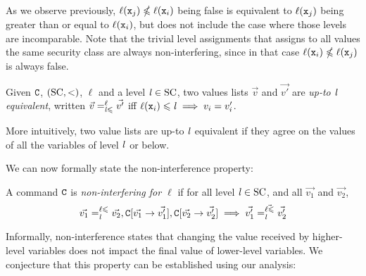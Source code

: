 As we observe previously, \(\ell(\mathtt{x}_j) \nleqslant \ell(\mathtt{x}_i)\) being false is equivalent to \(\ell(\mathtt{x}_j)\) being greater than or equal to \(\ell(\mathtt{x}_i)\), but does not include the case where those levels are incomparable.
Note that the trivial level assignments that assigns to all values the same security class are always non-interfering, since in that case \(\ell(\mathtt{x}_i) \nleqslant \ell(\mathtt{x}_j)\) is always false.


\begin{definition}[Up-to %
equivalence%
]
Given \(\mathtt{C}\), \((\mathrm{SC}, <)\), \(\ell\) and a level \(\mathit{l} \in \mathrm{SC}\), two values lists \(\vec{v}\) and \(\vec{v'}\) are \emph{up-to \(\mathit{l}\) equivalent}, written \(\vec{v}=^{\ell}_{\mathit{l} \leqslant} \vec{v'}\) iff
\(
\ell(\comm{x}_i) \leqslant \scl{l} \implies v_i=v'_i%
\).
\end{definition}

More intuitively, two value lists are up-to %
\(\mathit{l}\) equivalent if they agree on the values of all the variables of level \(\mathit{l}\) or below. %

We can now formally state the non-interference property:

\begin{definition}
\label{def:com-ni}
A command \(\mathtt{C}\) is \emph{non-interfering for \(\ell\)} if for all level \(\mathit{l} \in \mathrm{SC}\), and all %
\(\vec{v_1}\) and \(\vec{v_2}\),
\[
\vec{v_1}=^{\ell \leqslant}_{\mathit{l}} \vec{v_2}, \mathtt{C}[\vec{v_1} \rightarrow \vec{v_1'}], \mathtt{C}[\vec{v_2} \rightarrow \vec{v_2'}] \implies  \vec{v_1'}=^{\vec{\ell \leqslant}}_{\mathit{l}} \vec{v_2'}
\]
\end{definition}

Informally, non-interference states that changing the value received by higher-level variables does not impact the final value of lower-level variables.
We conjecture that this property can be established using our analysis:

